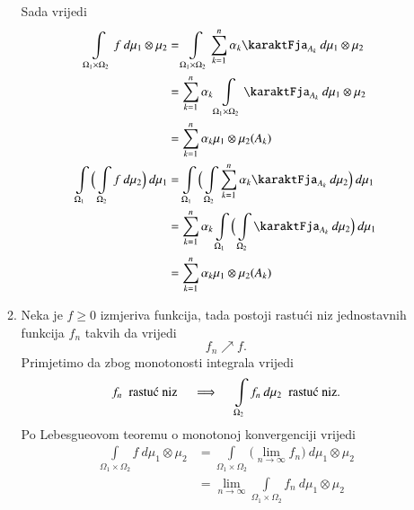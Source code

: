 \begin{rj}[\ref{zad:4.15}]
\begin{enumerate}[label=(\roman*)]
\begin{enumerate}[label=\arabic*. korak:]
            Sada vrijedi
            \begin{equation*}
                \begin{aligned}
                    \int\limits_{\Omega_1 \times \Omega_2} f \: d \mu_1 \otimes \mu_2 &= \int\limits_{\Omega_1 \times \Omega_2} \suma{k = 1}{n} \alpha_k \karaktFja_{A_k} \: d \mu_1 \otimes \mu_2\\
                    &= \suma{k = 1}{n} \alpha_k \int\limits_{\Omega_1 \times \Omega_2} \karaktFja_{A_k} \: d \mu_1 \otimes \mu_2\\
                    &= \suma{k = 1}{n} \alpha_k \mu_1 \otimes \mu_2 (A_k)\\
                    \int\limits_{\Omega_1} \Big( \int\limits_{\Omega_2} f \: d \mu_2 \Big) \: d \mu_1 &= \int\limits_{\Omega_1} \Big( \int\limits_{\Omega_2} \suma{k = 1}{n} \alpha_k \karaktFja_{A_k} \: d \mu_2 \Big) \: d \mu_1\\
                    &= \suma{k = 1}{n} \alpha_k \int\limits_{\Omega_1} \Big( \int\limits_{\Omega_2} \karaktFja_{A_k} \: d \mu_2 \Big) \: d \mu_1\\
                    &= \suma{k = 1}{n} \alpha_k \mu_1 \otimes \mu_2 (A_k)
                \end{aligned}
            \end{equation*}
            \item
            Neka je $f \geq 0$ izmjeriva funkcija, tada postoji rastu\' ci niz jednostavnih funkcija $f_n$ takvih da vrijedi
            \begin{equation*}
                f_n \nearrow f.
            \end{equation*}
            Primjetimo da zbog monotonosti integrala vrijedi
            \begin{equation*}
                f_n \; \textnormal{ rastu\' c niz} \quad \implies \quad \int\limits_{\Omega_2} f_n \: d \mu_2 \; \textnormal{ rastu\' c niz}.
            \end{equation*}
            Po Lebesgueovom teoremu o monotonoj konvergenciji vrijedi
            \begin{equation*}
                \begin{aligned}
                    \int\limits_{\Omega_1 \times \Omega_2} f \: d \mu_1 \otimes \mu_2 &= \int\limits_{\Omega_1 \times \Omega_2} \big(\lim\limits_{n \to \infty} f_n \big) \: d \mu_1 \otimes \mu_2\\
                    &= \lim\limits_{n \to \infty} \int\limits_{ \Omega_1 \times \Omega_2} f_n \: d \mu_1 \otimes \mu_2\\

\end{aligned}
\end{equation*}
\end{enumerate}
\end{enumerate}
\end{rj}
